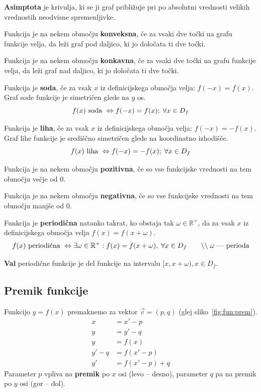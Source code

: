 \documentclass[a4paper,oneside,12pt,fleqn]{article}
\def\R{\ensuremath{\mathbb R}}
\newcommand{\comment}[1]{\ensuremath{\qquad\backslash\backslash\;}\textnormal{#1}}
\renewcommand\iff\Leftrightarrow
\numberwithin{equation}{section}
\begin{document}
\textbf{Asimptota} je krivulja, ki se ji graf približuje pri po absolutni vrednosti velikih
vrednostih neodvisne spremenljivke.

Funkcija je na nekem območju \textbf{konveksna}, če za vsaki dve točki na grafu funkcije
velja, da leži graf pod daljico, ki jo določata ti dve točki.

Funkcija je na nekem območju \textbf{konkavna}, če za vsaki dve točki na grafu funkcije velja, da
leži graf nad daljico, ki jo določata ti dve točki.

Funkcija je \textbf{soda}, če za vsak $x$ iz definicijskega območja velja: $f(-x) = f(x)$.
Graf sode funkcije je simetričen glede na $y$ os.
\[ f(x) \textnormal{ soda } \iff f(-x) = f(x); \; \forall x \in D_f \]

Funkcija je \textbf{liha}, če za vsak $x$ iz definicijskega območja velja: $f(-x) = -f(x)$.
Graf lihe funkcije je središčno simetričen glede na koordinatno izhodišče.
\[ f(x) \textnormal{ liha } \iff f(-x) = -f(x); \; \forall x \in D_f \]

Funkcija je na nekem območju \textbf{pozitivna}, če so vse funkcijske vrednosti na tem območju
večje od 0.

Funkcija je na nekem območju \textbf{negativna}, če so vse funkcijske vrednosti na tem območju
manjše od 0.

Funkcija je \textbf{periodična} natanko takrat, ko obstaja tak $\omega \in \R^+$, da za vsak $x$ iz
definicijskega območja velja $f(x) = f(x+\omega)$.
\[ f(x) \textnormal{ periodična } \iff \exists \omega \in \R^+: f(x) = f(x+\omega), \; \forall x \in
D_f \comment{$\omega$ --- perioda} \]

\textbf{Val} periodične funkcije je del funkcije na intervalu $[x, x+\omega), x \in D_f$.

\subsection{Premik funkcije}
\label{sec:fun:prem}
Funkcijo $y = f(x)$ premaknemo za vektor $\vec{v} = (p,q)$ (glej sliko~\ref{fig:fun:prem}).
\begin{align*}
  x &= x'-p \\
  y &= y'-q \\
  y &= f(x) \\
  y' - q &= f(x'-p) \\
  y' &= f(x'-p) + q
\end{align*}
Parameter $p$ vpliva na \textbf{premik}
po $x$ osi (levo -- desno), parameter $q$ pa na premik po $y$ osi (gor -- dol).
\end{document}
